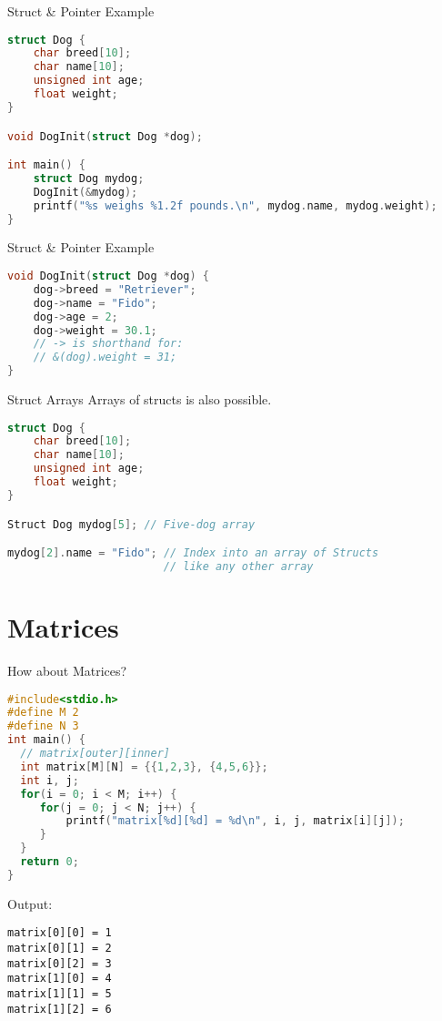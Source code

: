 \documentclass[graphics]{beamer}
\begin{document}
\begin{frame}[fragile]{Struct \& Pointer Example}
    \begin{lstlisting}[language=C,basicstyle=\scriptsize,keywordstyle=\color{blue},commentstyle=\color{green},showstringspaces=false,stringstyle=\color{red}]
struct Dog {
    char breed[10];
    char name[10];
    unsigned int age;
    float weight;
}

void DogInit(struct Dog *dog);

int main() {
    struct Dog mydog;
    DogInit(&mydog);
    printf("%s weighs %1.2f pounds.\n", mydog.name, mydog.weight);
}
    \end{lstlisting}
\end{frame}

\begin{frame}[fragile]{Struct \& Pointer Example}
    \begin{lstlisting}[language=C,basicstyle=\scriptsize,keywordstyle=\color{blue},commentstyle=\color{green},showstringspaces=false,stringstyle=\color{red}]
void DogInit(struct Dog *dog) {
    dog->breed = "Retriever";
    dog->name = "Fido";
    dog->age = 2;
    dog->weight = 30.1;
    // -> is shorthand for:
    // &(dog).weight = 31;
}
    \end{lstlisting}
\end{frame}

\begin{frame}[fragile]{Struct Arrays}
    Arrays of structs is also possible.
    \begin{lstlisting}[language=C,basicstyle=\scriptsize,keywordstyle=\color{blue},commentstyle=\color{green},showstringspaces=false,stringstyle=\color{red}]
struct Dog {
    char breed[10];
    char name[10];
    unsigned int age;
    float weight;
}

Struct Dog mydog[5]; // Five-dog array

mydog[2].name = "Fido"; // Index into an array of Structs
                        // like any other array
    \end{lstlisting}
\end{frame}

\section{Matrices}
\begin{frame}[fragile]{How about Matrices?}
    \begin{lstlisting}[language=C,basicstyle=\scriptsize,keywordstyle=\color{blue},commentstyle=\color{green},showstringspaces=false,stringstyle=\color{red}]
#include<stdio.h>
#define M 2
#define N 3
int main() {
  // matrix[outer][inner]
  int matrix[M][N] = {{1,2,3}, {4,5,6}};
  int i, j;
  for(i = 0; i < M; i++) {
     for(j = 0; j < N; j++) {
         printf("matrix[%d][%d] = %d\n", i, j, matrix[i][j]);
     }
  }
  return 0;
}
    \end{lstlisting}
    Output:
    \scriptsize
    \begin{verbatim}
matrix[0][0] = 1
matrix[0][1] = 2
matrix[0][2] = 3
matrix[1][0] = 4
matrix[1][1] = 5
matrix[1][2] = 6
    \end{verbatim}
\end{frame}
\end{document}
